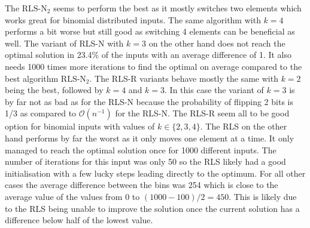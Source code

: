 The $\text{RLS-N}_2$ seems to perform the best as it mostly switches two elements which works great for binomial distributed inputs. 
The same algorithm with $k=4$ performs a bit worse but still good as switching 4 elements can be beneficial as well.
The variant of RLS-N with $k=3$ on the other hand does not reach the optimal solution in 23.4\% of the inputs with an average difference of 1.
It also needs 1000 times more iterations to find the optimal on average compared to the best algorithm $\text{RLS-N}_2$.
The RLS-R variants behave mostly the same with $k=2$ being the best, followed by $k=4$ and $k=3$.
In this case the variant of $k=3$ is by far not as bad as for the RLS-N because the probability of flipping 2 bits is 1/3 as compared to $\mathcal{O}(n^{-1})$ for the RLS-N.
The RLS-R seem all to be good option for binomial inputs with values of $k\in\{2,3,4\}$.
The RLS on the other hand performs by far the worst as it only moves one element at a time.
It only managed to reach the optimal solution once for 1000 different inputs.
The number of iterations for this input was only 50 so the RLS likely had a good initialisation with a few lucky steps leading directly to the optimum.
For all other cases the average difference between the bins was 254 which is close to the average value of the values from 0 to $(1000-100)/2=450$.
This is likely due to the RLS being unable to improve the solution once the current solution has a difference below half of the lowest value.